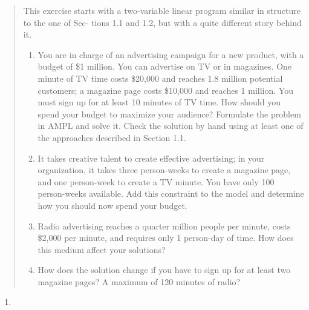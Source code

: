 \documentclass[11pt]{article}
\begin{document}
\begin{enumerate}
\begin{quote}
This exercise starts with a two-variable linear program similar in structure to the one of Sec-
tions 1.1 and 1.2, but with a quite different story behind it.
\begin{enumerate}
\item You are in charge of an advertising campaign for a new product, with a budget of \$1 million.
You can advertise on TV or in magazines. One minute of TV time costs \$20,000 and reaches 1.8
million potential customers; a magazine page costs \$10,000 and reaches 1 million. You must sign
up for at least 10 minutes of TV time. How should you spend your budget to maximize your audience? Formulate the problem in AMPL and solve it. Check the solution by hand using at least one of the approaches described in Section 1.1.

\item It takes creative talent to create effective advertising; in your organization, it takes three
person-weeks to create a magazine page, and one person-week to create a TV minute. You have
only 100 person-weeks available. Add this constraint to the model and determine how you should
now spend your budget.
\item Radio advertising reaches a quarter million people per minute, costs \$2,000 per minute, and
requires only 1 person-day of time. How does this medium affect your solutions?
\item How does the solution change if you have to sign up for at least two magazine pages? A maximum of 120 minutes of radio?
\end{enumerate}
\end{quote}

\begin{enumerate}
\item 

\end{enumerate}

\end{enumerate}
\end{document}
